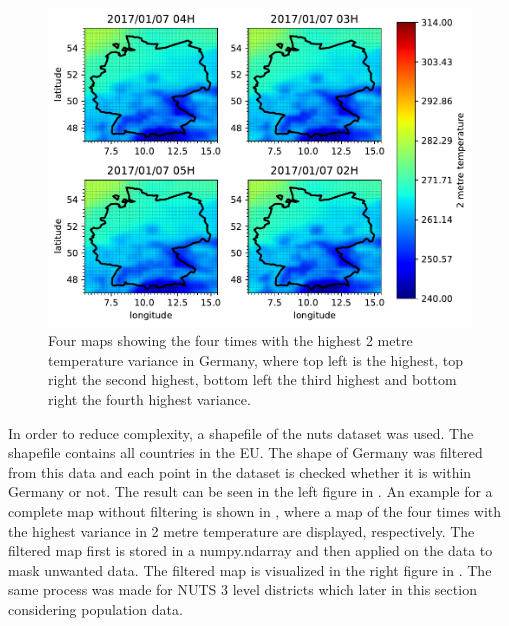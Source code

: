 

\begin{figure}[h!]%
\centering
\includegraphics[width=\textwidth]{plots/t2m/bundles/maxvar4_maps}%
\caption{Four maps showing the four times with the highest 2 metre temperature variance in Germany, where top left is the highest, top right the second highest, bottom left the third highest and bottom right the fourth highest variance.}%
\label{fig:maxvar4_maps}%
\end{figure}

In order to reduce complexity, a shapefile of the \acrshort{nuts} dataset was used. The shapefile contains all countries in the EU. The shape of Germany was filtered from this data and each point in the dataset is checked whether it is within Germany or not. The result can be seen in the left figure in . An example for a complete map without filtering is shown in , where a map of the four times with the highest variance in 2 metre temperature are displayed, respectively. The filtered map first is stored in a numpy.ndarray and then applied on the data to mask unwanted data. The filtered map is visualized in the right figure in . The same process was made for NUTS 3 level districts which later in this section considering population data.\\

